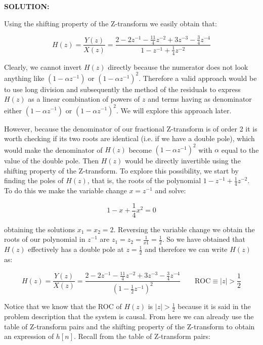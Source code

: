 \documentclass[a4paper,11pt,oneside]{article}
\begin{document}
\vspace{1cm}
\textbf{SOLUTION:}

Using the shifting property of the Z-transform we easily obtain that:

\begin{equation}\label{hz}
H(z)=\frac{Y(z)}{X(z)}=\frac{2-2z^{-1}-\frac{11}{4}z^{-2}+3z^{-3}-\frac{3}{4}z^{-4}}{1-z^{-1}+\frac{1}{4}z^{-2}}
\end{equation}

Clearly, we cannot invert $H(z)$ directly because the numerator does not look anything like $(1-\alpha z^{-1})$ or $(1-\alpha z^{-1})^2$. Therefore a valid approach would be to use long division and subsequently the method of the residuals to express $H(z)$ as a linear combination of powers of $z$ and terms having as denominator either $(1-\alpha z^{-1})$ or $(1-\alpha z^{-1})^2$. We will explore this approach later. 

However, because the denominator of our fractional Z-transform is of order 2 it is worth checking if its two roots are identical (i.e. if we have a double pole), which would make the denominator of $H(z)$ become $(1-\alpha z^{-1})^2$ with $\alpha$ equal to the value of the double pole. Then $H(z)$ would be directly invertible using the shifting property of the Z-transform. To explore this possibility, we start by finding the poles of $H(z)$, that is, the roots of the polynomial $1-z^{-1}+\frac{1}{4}z^{-2}$. To do this we make the variable change $x=z^{-1}$ and solve:

\[
1-x+\frac{1}{4}x^{2}=0
\]

obtaining the solutions $x_1=x_2=2$. Reversing the variable change we obtain the roots of our polynomial in $z^{-1}$ are $z_1=z_2=\frac{1}{x1}=\frac{1}{2}$. So we have obtained that $H(z)$ effectively has a double pole at $z=\frac{1}{2}$ and therefore we can write $H(z)$ as:

\begin{equation}\label{eq:hz}
H(z)=\frac{Y(z)}{X(z)}=\frac{2-2z^{-1}-\frac{11}{4}z^{-2}+3z^{-3}-\frac{3}{4}z^{-4}}{(1-\frac{1}{2}z^{-1})^2} \qquad \textrm{ROC}\equiv |z|>\frac{1}{2}
\end{equation}

Notice that we know that the ROC of $H(z)$ is $|z|>\frac{1}{2}$ because it is said in the problem description that the system is causal. From here we can already use the table of Z-transform pairs and the shifting property of the Z-transform to obtain an expression of $h[n]$. Recall from the table of Z-transform pairs:
\end{document}
